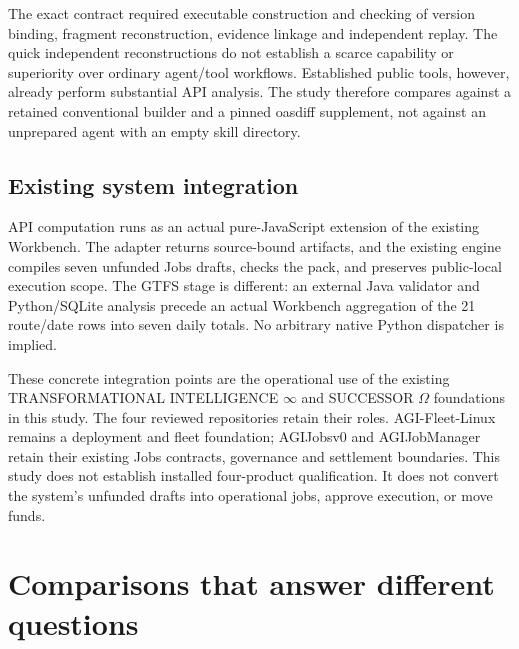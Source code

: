 \documentclass[11pt,letterpaper]{article}
\begin{document}
The exact contract required executable construction and checking of version binding,
fragment reconstruction, evidence linkage and independent replay. The quick independent
reconstructions do not establish a scarce capability or superiority over ordinary agent/tool
workflows. Established
public tools, however, already perform substantial API analysis. The study therefore compares
against a retained conventional builder and a pinned oasdiff supplement, not against an
unprepared agent with an empty skill directory.

\subsection{Existing system integration}

API computation runs as an actual pure-JavaScript extension of the existing Workbench.
The adapter returns source-bound artifacts, and the existing engine compiles seven unfunded
Jobs drafts, checks the pack, and preserves public-local execution scope. The GTFS stage is
different: an external Java validator and Python/SQLite analysis precede an actual Workbench
aggregation of the 21 route/date rows into seven daily totals. No arbitrary native Python
dispatcher is implied.

These concrete integration points are the operational use of the existing TRANSFORMATIONAL
INTELLIGENCE $\infty$ and SUCCESSOR $\Omega$ foundations in this study.
The four reviewed repositories retain their roles. AGI-Fleet-Linux remains a deployment and
fleet foundation; AGIJobsv0 and AGIJobManager retain their existing Jobs contracts, governance
and settlement boundaries. This study does not establish installed four-product qualification.
It does not convert the system's unfunded drafts into operational jobs, approve execution,
or move funds.

\section{Comparisons that answer different questions}
\end{document}
